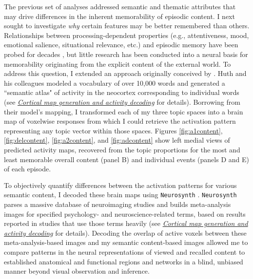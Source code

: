\documentclass{article}
\begin{document}
The previous set of analyses addressed semantic and thematic attributes that may drive differences in the inherent memorability of episodic content.  I next sought to investigate \textit{why} certain features may be better remembered than others.  Relationships between processing-dependent properties (e.g., attentiveness, mood, emotional salience, situational relevance, etc.) and episodic memory have been probed for decades \citep{ChunTurk07,TyngEtal17}, but little research has been conducted into a neural basis for memorability originating from the explicit content of the external world.  To address this question, I extended an approach originally conceived by \cite{HuthEtal16}. Huth and his colleagues modeled a vocabulary of over 10,000 words and generated a ``semantic atlas" of activity in the neocortex corresponding to individual words (see \hyperref[sec:brainmethods]{\textit{Cortical map generation and activity decoding}} for details).  Borrowing from their model's mapping, I transformed each of my three topic spaces into a brain map of voxelwise responses from which I could retrieve the activation pattern representing any topic vector within those spaces.  Figures \ref{fig:a1content}, \ref{fig:delcontent}, \ref{fig:a2content}, and \ref{fig:adcontent} show left medial views of predicted activity maps, recovered from the topic proportions for the most and least memorable overall content (panel B) and individual events (panels D and E) of each episode.  

To objectively quantify differences between the activation patterns for various semantic content, I decoded these brain maps using \texttt{Neurosynth} \citep{YarkEtal11}.  \texttt{Neurosynth} parses a massive database of neuroimaging studies and builds meta-analysis images for specified psychology- and neuroscience-related terms, based on results reported in studies that use those terms heavily (see \hyperref[sec:brainmethods]{\textit{Cortical map generation and activity decoding}} for details).  Decoding the overlap of active voxels between these meta-analysis-based images and my semantic content-based images allowed me to compare patterns in the neural representations of viewed and recalled content to established anatomical and functional regions and networks in a blind, unbiased manner beyond visual observation and inference.  
\end{document}
